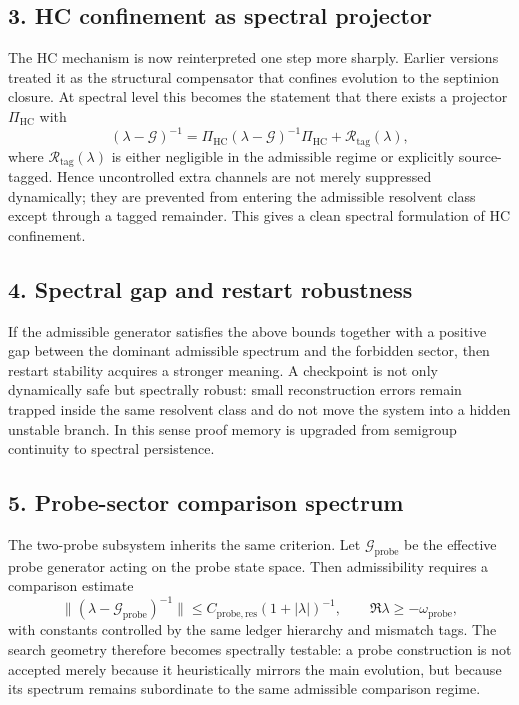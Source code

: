 \documentclass[12pt,a4paper]{article}
\begin{document}
\subsection*{3. HC confinement as spectral projector}
The HC mechanism is now reinterpreted one step more sharply. Earlier versions treated
it as the structural compensator that confines evolution to the septinion closure.
At spectral level this becomes the statement that there exists a projector
$\Pi_{\mathrm{HC}}$ with
\[
(\lambda-\mathcal G)^{-1}
= \Pi_{\mathrm{HC}}(\lambda-\mathcal G)^{-1}\Pi_{\mathrm{HC}}
+ \mathcal R_{\mathrm{tag}}(\lambda),
\]
where $\mathcal R_{\mathrm{tag}}(\lambda)$ is either negligible in the admissible
regime or explicitly source-tagged. Hence uncontrolled extra channels are not merely
suppressed dynamically; they are prevented from entering the admissible resolvent
class except through a tagged remainder. This gives a clean spectral formulation of
HC confinement.

\subsection*{4. Spectral gap and restart robustness}
If the admissible generator satisfies the above bounds together with a positive gap
between the dominant admissible spectrum and the forbidden sector, then restart
stability acquires a stronger meaning. A checkpoint is not only dynamically safe but
spectrally robust: small reconstruction errors remain trapped inside the same
resolvent class and do not move the system into a hidden unstable branch. In this
sense proof memory is upgraded from semigroup continuity to spectral persistence.

\subsection*{5. Probe-sector comparison spectrum}
The two-probe subsystem inherits the same criterion. Let
$\mathcal G_{\mathrm{probe}}$ be the effective probe generator acting on the probe
state space. Then admissibility requires a comparison estimate
\[
\| (\lambda-\mathcal G_{\mathrm{probe}})^{-1} \| 
\le C_{\mathrm{probe,res}}(1+|\lambda|)^{-1},
\qquad \Re\lambda\ge -\omega_{\mathrm{probe}},
\]
with constants controlled by the same ledger hierarchy and mismatch tags. The search
geometry therefore becomes spectrally testable: a probe construction is not accepted
merely because it heuristically mirrors the main evolution, but because its spectrum
remains subordinate to the same admissible comparison regime.
\end{document}
